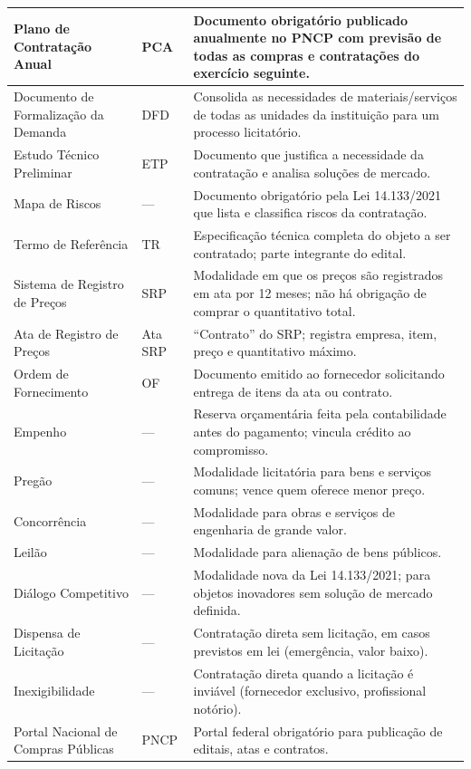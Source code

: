 \documentclass[a4paper,12pt]{article}
\begin{document}
\begin{longtable}{@{} p{4.5cm} p{1.8cm} p{8.5cm} @{}}
Plano de Contratação Anual & PCA & Documento obrigatório publicado anualmente no PNCP com previsão de todas as compras e contratações do exercício seguinte. \\ \midrule
Documento de Formalização da Demanda & DFD & Consolida as necessidades de materiais/serviços de todas as unidades da instituição para um processo licitatório. \\ \midrule
Estudo Técnico Preliminar & ETP & Documento que justifica a necessidade da contratação e analisa soluções de mercado. \\ \midrule
Mapa de Riscos & --- & Documento obrigatório pela Lei 14.133/2021 que lista e classifica riscos da contratação. \\ \midrule
Termo de Referência & TR & Especificação técnica completa do objeto a ser contratado; parte integrante do edital. \\ \midrule
Sistema de Registro de Preços & SRP & Modalidade em que os preços são registrados em ata por 12 meses; não há obrigação de comprar o quantitativo total. \\ \midrule
Ata de Registro de Preços & Ata SRP & ``Contrato'' do SRP; registra empresa, item, preço e quantitativo máximo. \\ \midrule
Ordem de Fornecimento & OF & Documento emitido ao fornecedor solicitando entrega de itens da ata ou contrato. \\ \midrule
Empenho & --- & Reserva orçamentária feita pela contabilidade antes do pagamento; vincula crédito ao compromisso. \\ \midrule
Pregão & --- & Modalidade licitatória para bens e serviços comuns; vence quem oferece menor preço. \\ \midrule
Concorrência & --- & Modalidade para obras e serviços de engenharia de grande valor. \\ \midrule
Leilão & --- & Modalidade para alienação de bens públicos. \\ \midrule
Diálogo Competitivo & --- & Modalidade nova da Lei 14.133/2021; para objetos inovadores sem solução de mercado definida. \\ \midrule
Dispensa de Licitação & --- & Contratação direta sem licitação, em casos previstos em lei (emergência, valor baixo). \\ \midrule
Inexigibilidade & --- & Contratação direta quando a licitação é inviável (fornecedor exclusivo, profissional notório). \\ \midrule
Portal Nacional de Compras Públicas & PNCP & Portal federal obrigatório para publicação de editais, atas e contratos. \\ \midrule

\end{longtable}
\end{document}

